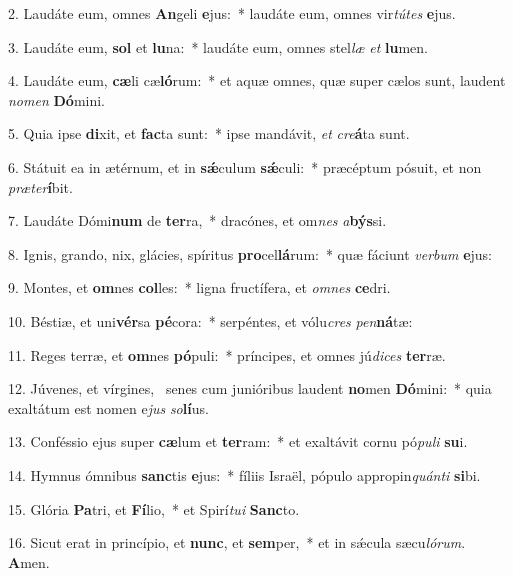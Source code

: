 2. Laudáte eum, omnes \textbf{An}geli \textbf{e}jus:~*  laudáte eum, omnes vir\textit{tú}\textit{tes} \textbf{e}jus.\

3. Laudáte eum, \textbf{sol} et \textbf{lu}na:~*  laudáte eum, omnes stel\textit{læ} \textit{et} \textbf{lu}men.\

4. Laudáte eum, \textbf{cæ}li cæ\textbf{ló}rum:~*  et aquæ omnes, quæ super cælos sunt, laudent \textit{no}\textit{men} \textbf{Dó}mini.\

5. Quia ipse \textbf{di}xit, et \textbf{fac}ta sunt:~*  ipse mandávit, \textit{et} \textit{cre}\textbf{á}ta sunt.\

6. Státuit ea in ætérnum, et in \textbf{sǽ}culum \textbf{sǽ}culi:~*  præcéptum pósuit, et non \textit{præ}\textit{ter}\textbf{í}bit.\

7. Laudáte Dómi\textbf{num} de \textbf{ter}ra,~*  dracónes, et om\textit{nes} \textit{a}\textbf{býs}si.\

8. Ignis, grando, nix, glácies, spíritus \textbf{pro}cel\textbf{lá}rum:~*  quæ fáciunt \textit{ver}\textit{bum} \textbf{e}jus:\

9. Montes, et \textbf{om}nes \textbf{col}les:~*  ligna fructífera, et \textit{om}\textit{nes} \textbf{ce}dri.\

10. Béstiæ, et uni\textbf{vér}sa \textbf{pé}cora:~*  serpéntes, et vólu\textit{cres} \textit{pen}\textbf{ná}tæ:\

11. Reges terræ, et \textbf{om}nes \textbf{pó}puli:~*  príncipes, et omnes jú\textit{di}\textit{ces} \textbf{ter}ræ.\

12. Júvenes, et vírgines, \dag\  senes cum junióribus laudent \textbf{no}men \textbf{Dó}mini:~*  quia exaltátum est nomen e\textit{jus} \textit{so}\textbf{lí}us.\

13. Conféssio ejus super \textbf{cæ}lum et \textbf{ter}ram:~*  et exaltávit cornu pó\textit{pu}\textit{li} \textbf{su}i.\

14. Hymnus ómnibus \textbf{sanc}tis \textbf{e}jus:~*  fíliis Israël, pópulo appropin\textit{quán}\textit{ti} \textbf{si}bi.\

15. Glória \textbf{Pa}tri, et \textbf{Fí}lio,~*  et Spirí\textit{tu}\textit{i} \textbf{Sanc}to.\

16. Sicut erat in princípio, et \textbf{nunc}, et \textbf{sem}per,~*  et in sǽcula sæcu\textit{ló}\textit{rum}. \textbf{A}men.\

